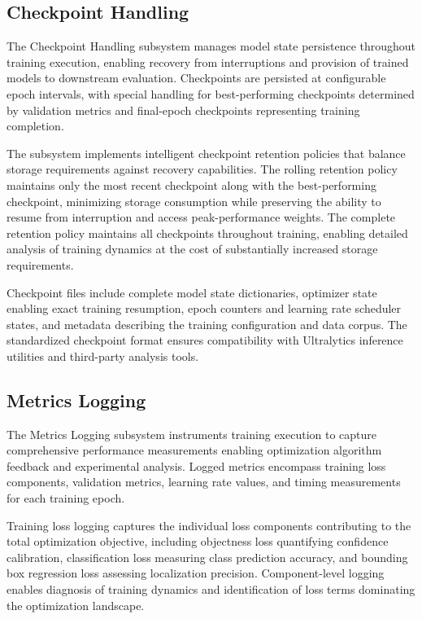 \subsection{Checkpoint Handling}

The Checkpoint Handling subsystem manages model state persistence throughout training execution, enabling recovery from interruptions and provision of trained models to downstream evaluation. Checkpoints are persisted at configurable epoch intervals, with special handling for best-performing checkpoints determined by validation metrics and final-epoch checkpoints representing training completion.

The subsystem implements intelligent checkpoint retention policies that balance storage requirements against recovery capabilities. The rolling retention policy maintains only the most recent checkpoint along with the best-performing checkpoint, minimizing storage consumption while preserving the ability to resume from interruption and access peak-performance weights. The complete retention policy maintains all checkpoints throughout training, enabling detailed analysis of training dynamics at the cost of substantially increased storage requirements.

Checkpoint files include complete model state dictionaries, optimizer state enabling exact training resumption, epoch counters and learning rate scheduler states, and metadata describing the training configuration and data corpus. The standardized checkpoint format ensures compatibility with Ultralytics inference utilities and third-party analysis tools.

\subsection{Metrics Logging}

The Metrics Logging subsystem instruments training execution to capture comprehensive performance measurements enabling optimization algorithm feedback and experimental analysis. Logged metrics encompass training loss components, validation metrics, learning rate values, and timing measurements for each training epoch.

Training loss logging captures the individual loss components contributing to the total optimization objective, including objectness loss quantifying confidence calibration, classification loss measuring class prediction accuracy, and bounding box regression loss assessing localization precision. Component-level logging enables diagnosis of training dynamics and identification of loss terms dominating the optimization landscape.

